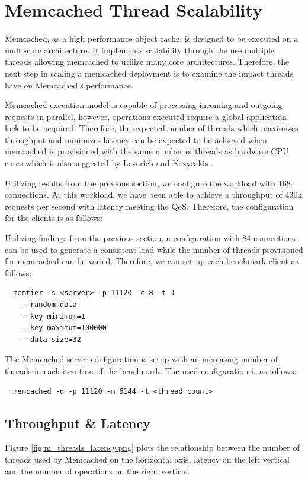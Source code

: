 \section{Memcached Thread Scalability}
Memcached, as a high performance object cache, is designed to be executed on a multi-core architecture. It implements scalability through the use multiple threads allowing memcached to utilize many core architectures. Therefore, the next step in scaling a memcached deployment is to examine the impact threads have on Memcached's performance.

Memcached execution model is capable of processing incoming and outgoing requests in parallel, however, operations executed require a global application lock to be acquired. Therefore, the expected number of threads which maximizes throughput and minimizes latency can be expected to be achieved when memcached is provisioned with the same number of threads as hardware CPU cores which is also suggested by Leverich and Kozyrakis \cite{leverich2014reconciling}.

Utilizing results from the previous section, we configure the workload with 168 connections. At this workload, we have been able to achieve a throughput of 430k requests per second with latency meeting the QoS. Therefore, the configuration for the clients is as follows:

Utilizing findings from the previous section, a configuration with 84 connections can be used to generate a consistent load while the number of threads provisioned for memcached can be varied. Therefore, we can set up each benchmark client as follows:

\begin{lstlisting}
  memtier -s <server> -p 11120 -c 8 -t 3
    --random-data
    --key-minimum=1
    --key-maximum=100000
    --data-size=32
\end{lstlisting}

The Memcached server configuration is setup with an increasing number of threads in each iteration of the benchmark. The used configuration is as follows:
\begin{lstlisting}
  memcached -d -p 11120 -m 6144 -t <thread_count>
\end{lstlisting}


\subsection{Throughput \& Latency}

Figure \ref{fig:m_threads_latency.png} plots the relationship between the number of threads used by Memcached on the horizontal axis, latency on the left vertical and the number of operations on the right vertical.


